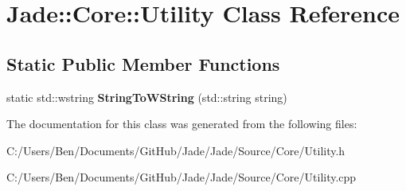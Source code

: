 \hypertarget{class_jade_1_1_core_1_1_utility}{}\section{Jade\+:\+:Core\+:\+:Utility Class Reference}
\label{class_jade_1_1_core_1_1_utility}
\subsection*{Static Public Member Functions}
\begin{DoxyCompactItemize}
\item 
\hypertarget{class_jade_1_1_core_1_1_utility_ae01de942236cb4bb6067ea55d1e5eaa5}{}static std\+::wstring {\bfseries String\+To\+W\+String} (std\+::string string)\label{class_jade_1_1_core_1_1_utility_ae01de942236cb4bb6067ea55d1e5eaa5}

\end{DoxyCompactItemize}


The documentation for this class was generated from the following files\+:\begin{DoxyCompactItemize}
\item 
C\+:/\+Users/\+Ben/\+Documents/\+Git\+Hub/\+Jade/\+Jade/\+Source/\+Core/Utility.\+h\item 
C\+:/\+Users/\+Ben/\+Documents/\+Git\+Hub/\+Jade/\+Jade/\+Source/\+Core/Utility.\+cpp\end{DoxyCompactItemize}
